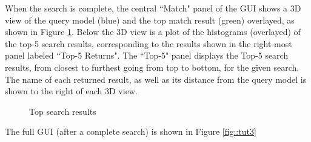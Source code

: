 \documentclass[12pt]{article}
\begin{document}
	\noindent
	When the search is complete, the central ``Match" panel of the GUI shows a 3D view of the query model (blue) and the top match result (green) overlayed, as shown in Figure \ref{fig::tut2}. Below the 3D view is a plot of the histograms (overlayed) of the top-5 search results, corresponding to the results shown in the right-most panel labeled ``Top-5 Returns". The ``Top-5" panel displays the Top-5 search results, from closest to furthest going from top to bottom, for the given search. The name of each returned result, as well as its distance from the query model is shown to the right of each 3D view.
	\begin{figure}[!h]
		\centering
		\caption{Top search results}
		\label{fig::tut2}
	\end{figure}
	\noindent
	The full GUI (after a complete search) is shown in Figure \ref{fig::tut3}
\end{document}
